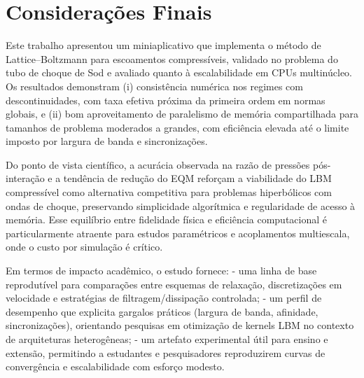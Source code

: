 
\chapter[Considerações Finais]{Considerações Finais}\label{ch:consideracoes-finais}






Este trabalho apresentou um miniaplicativo que implementa o método de Lattice–Boltzmann para escoamentos compressíveis, validado no problema do tubo de choque de Sod e avaliado quanto à escalabilidade em CPUs multinúcleo.
Os resultados demonstram (i) consistência numérica nos regimes com descontinuidades, com taxa efetiva próxima da primeira ordem em normas globais, e (ii) bom aproveitamento de paralelismo de memória compartilhada para tamanhos de problema moderados a grandes, com eficiência elevada até o limite imposto por largura de banda e sincronizações.

Do ponto de vista científico, a acurácia observada na razão de pressões pós-interação e a tendência de redução do EQM reforçam a viabilidade do LBM compressível como alternativa competitiva para problemas hiperbólicos com ondas de choque, preservando simplicidade algorítmica e regularidade de acesso à memória.
Esse equilíbrio entre fidelidade física e eficiência computacional é particularmente atraente para estudos paramétricos e acoplamentos multiescala, onde o custo por simulação é crítico.

Em termos de impacto acadêmico, o estudo fornece:
- uma linha de base reprodutível para comparações entre esquemas de relaxação, discretizações em velocidade e estratégias de filtragem/dissipação controlada;
- um perfil de desempenho que explicita gargalos práticos (largura de banda, afinidade, sincronizações), orientando pesquisas em otimização de kernels LBM no contexto de arquiteturas heterogêneas;
- um artefato experimental útil para ensino e extensão, permitindo a estudantes e pesquisadores reproduzirem curvas de convergência e escalabilidade com esforço modesto.

